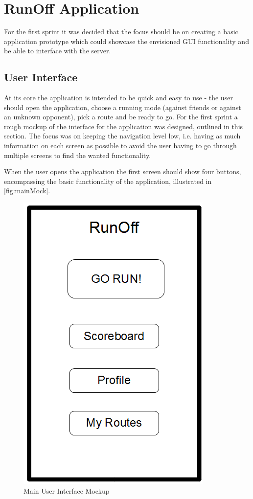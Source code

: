 \section{RunOff Application}
For the first sprint it was decided that the focus should be on creating a basic application prototype which could showcase the envisioned \ac{GUI} functionality and be able to interface with the server. 

\subsection{User Interface}
At its core the application is intended to be quick and easy to use - the user should open the application, choose a running mode (against friends or against an unknown opponent), pick a route and be ready to go. For the first sprint a rough mockup of the interface for the application was designed, outlined in this section. The focus was on keeping the navigation level low, i.e. having as much information on each screen as possible to avoid the user having to go through multiple screens to find the wanted functionality.

When the user opens the application the first screen should show four buttons, encompassing the basic functionality of the application, illustrated in \autoref{fig:mainMock}.

\begin{figure}[!ht]
	\begin{center}
		\includegraphics[scale=0.4]{img/mainMockV1.png}
		\caption{Main User Interface Mockup}
		\label{fig:mainMock}
	\end{center}
\end{figure}

